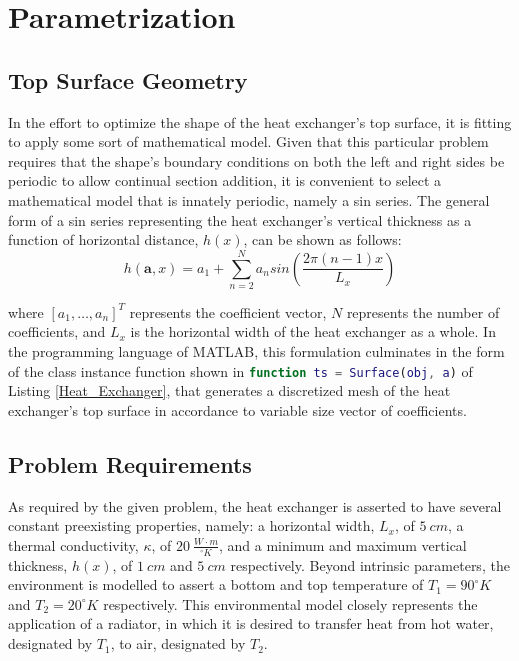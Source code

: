 \documentclass{article}
\begin{document}
\section{Parametrization}
\subsection{Top Surface Geometry}
In the effort to optimize the shape of the heat exchanger's top surface, it is fitting to apply some sort of mathematical model. Given that this particular problem requires that the shape's boundary conditions on both the left and right sides be periodic to allow continual section addition, it is convenient to select a mathematical model that is innately periodic, namely a sin series. The general form of a sin series representing the heat exchanger's vertical thickness as a function of horizontal distance, $h(x)$, can be shown as follows:
\begin{equation}
   h(\mathbf{a},x) = a_1 + \sum_{n=2}^{N} a_n sin \left( \frac{2 \pi (n-1) x}{L_x} \right)
   \label{eq:sin}
\end{equation}

where $[ a_1, \dots , a_n ]^T$ represents the coefficient vector, $N$ represents the number of coefficients, and $L_x$ is the horizontal width of the heat exchanger as a whole. In the programming language of MATLAB, this formulation culminates in the form of the class instance function shown in \lstinline[language=MATLAB]{function ts = Surface(obj, a)} of Listing \ref{Heat_Exchanger}, that generates a discretized mesh of the heat exchanger's top surface in accordance to variable size vector of coefficients.

\subsection{Problem Requirements}
As required by the given problem, the heat exchanger is asserted to have several constant preexisting properties, namely: a horizontal width, $L_x$, of $5~cm$, a thermal conductivity, $\kappa$, of $20~\frac{W \cdot m}{ ^\circ K}$, and a minimum and maximum vertical thickness, $h(x)$, of $1~cm$ and $5~cm$ respectively. Beyond intrinsic parameters, the environment is modelled to assert a bottom and top temperature of $T_1 = 90^\circ K$ and $T_2 = 20^\circ K$ respectively. This environmental model closely represents the application of a radiator, in which it is desired to transfer heat from hot water, designated by $T_1$, to air, designated by $T_2$.
\end{document}
